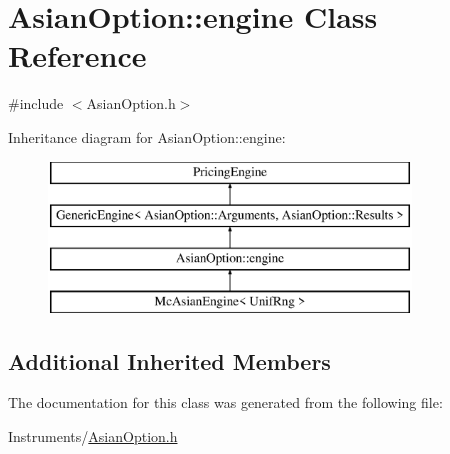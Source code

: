 \hypertarget{class_asian_option_1_1engine}{}\section{Asian\+Option\+:\+:engine Class Reference}
\label{class_asian_option_1_1engine}


{\ttfamily \#include $<$Asian\+Option.\+h$>$}

Inheritance diagram for Asian\+Option\+:\+:engine\+:\begin{figure}[H]
\begin{center}
\leavevmode
\includegraphics[height=4.000000cm]{class_asian_option_1_1engine}
\end{center}
\end{figure}
\subsection*{Additional Inherited Members}


The documentation for this class was generated from the following file\+:\begin{DoxyCompactItemize}
\item 
Instruments/\hyperlink{_asian_option_8h}{Asian\+Option.\+h}\end{DoxyCompactItemize}

